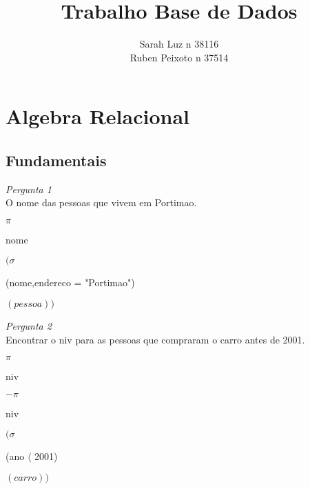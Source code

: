 \documentclass[12pt,a4paper]{article}
\begin{document}
\title{Trabalho Base de Dados}
\author{Sarah Luz n 38116 \\ Ruben Peixoto n 37514}
\date{}
\maketitle
\section*{Algebra Relacional}
\subsection*{Fundamentais}
\textit{Pergunta 1}\\
O nome das pessoas que vivem em Portimao.\\
\begin{center}
$\pi$\begin{tiny}
nome
\end{tiny}$(\sigma$ \begin{tiny}
(nome,endereco = "Portimao")
\end{tiny}$(pessoa))$
\end{center} 
\textit{Pergunta 2}\\
Encontrar o niv para as pessoas que compraram o carro antes de 2001.\\
\begin{center}
$\pi $\begin{tiny}
niv
\end{tiny}$ - \pi$ \begin{tiny}
niv
\end{tiny}$(\sigma$\begin{tiny}
(ano $\langle$ 2001)
\end{tiny}$(carro))$
\end{center}
\end{document}
